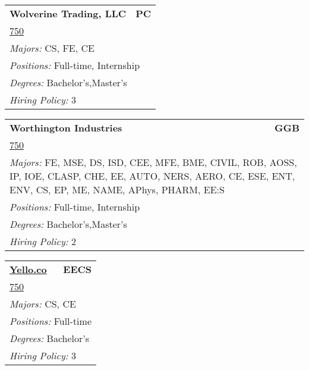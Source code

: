 \documentclass[twoside]{article}
\begin{document}
\begin{center}
\begin{multicols}{3}
\begin{FlushLeft}
\begin{minipage}{.9\columnwidth}
\end{minipage}
 
\begin{minipage}{.9\columnwidth}\begin{tabularx}{.95\columnwidth}{Xr}
                 {\Large\bf Wolverine Trading, LLC} & {\Large\bf PC}\\
    \multicolumn{2}{p{.95\columnwidth}}{\url{750}}\\
    \multicolumn{2}{p{.95\columnwidth}}{\emph{Majors:} CS, FE, CE}\\
    \multicolumn{2}{p{.95\columnwidth}}{\emph{Positions:} Full-time, Internship}\\
    \multicolumn{2}{p{.95\columnwidth}}{\emph{Degrees:} Bachelor's,Master's}\\
    \multicolumn{2}{p{.95\columnwidth}}{\emph{Hiring Policy:} 3}\\
    \end{tabularx}
    
\end{minipage}
 
\begin{minipage}{.9\columnwidth}\begin{tabularx}{.95\columnwidth}{Xr}
                 {\Large\bf Worthington Industries} & {\Large\bf GGB}\\
    \multicolumn{2}{p{.95\columnwidth}}{\url{750}}\\
    \multicolumn{2}{p{.95\columnwidth}}{\emph{Majors:} FE, MSE, DS, ISD, CEE, MFE, BME, CIVIL, ROB, AOSS, IP, IOE, CLASP, CHE, EE, AUTO, NERS, AERO, CE, ESE, ENT, ENV, CS, EP, ME, NAME, APhys, PHARM, EE:S}\\
    \multicolumn{2}{p{.95\columnwidth}}{\emph{Positions:} Full-time, Internship}\\
    \multicolumn{2}{p{.95\columnwidth}}{\emph{Degrees:} Bachelor's,Master's}\\
    \multicolumn{2}{p{.95\columnwidth}}{\emph{Hiring Policy:} 2}\\
    \end{tabularx}
    
\end{minipage}
 
\begin{minipage}{.9\columnwidth}\begin{tabularx}{.95\columnwidth}{Xr}
                 {\Large\bf \url{Yello.co}} & {\Large\bf EECS}\\
    \multicolumn{2}{p{.95\columnwidth}}{\url{750}}\\
    \multicolumn{2}{p{.95\columnwidth}}{\emph{Majors:} CS, CE}\\
    \multicolumn{2}{p{.95\columnwidth}}{\emph{Positions:} Full-time}\\
    \multicolumn{2}{p{.95\columnwidth}}{\emph{Degrees:} Bachelor's}\\
    \multicolumn{2}{p{.95\columnwidth}}{\emph{Hiring Policy:} 3}\\
    \end{tabularx}
    

\end{minipage}
\end{FlushLeft}
\end{multicols}
\end{center}
\end{document}
